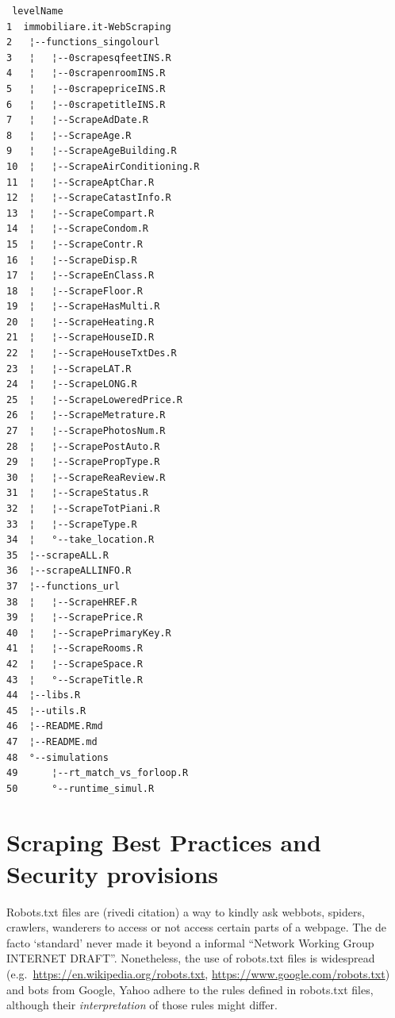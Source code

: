 \documentclass[
  12pt,
  a4paper,
  oneside]{book}
\theoremstyle{definition}
\theoremstyle{definition}
\theoremstyle{definition}
\theoremstyle{remark}
\begin{document}
\begin{verbatim}
 levelName
1  immobiliare.it-WebScraping     
2   ¦--functions_singolourl       
3   ¦   ¦--0scrapesqfeetINS.R     
4   ¦   ¦--0scrapenroomINS.R      
5   ¦   ¦--0scrapepriceINS.R      
6   ¦   ¦--0scrapetitleINS.R      
7   ¦   ¦--ScrapeAdDate.R         
8   ¦   ¦--ScrapeAge.R            
9   ¦   ¦--ScrapeAgeBuilding.R    
10  ¦   ¦--ScrapeAirConditioning.R
11  ¦   ¦--ScrapeAptChar.R        
12  ¦   ¦--ScrapeCatastInfo.R     
13  ¦   ¦--ScrapeCompart.R        
14  ¦   ¦--ScrapeCondom.R         
15  ¦   ¦--ScrapeContr.R          
16  ¦   ¦--ScrapeDisp.R           
17  ¦   ¦--ScrapeEnClass.R        
18  ¦   ¦--ScrapeFloor.R          
19  ¦   ¦--ScrapeHasMulti.R       
20  ¦   ¦--ScrapeHeating.R        
21  ¦   ¦--ScrapeHouseID.R        
22  ¦   ¦--ScrapeHouseTxtDes.R    
23  ¦   ¦--ScrapeLAT.R            
24  ¦   ¦--ScrapeLONG.R           
25  ¦   ¦--ScrapeLoweredPrice.R   
26  ¦   ¦--ScrapeMetrature.R      
27  ¦   ¦--ScrapePhotosNum.R      
28  ¦   ¦--ScrapePostAuto.R       
29  ¦   ¦--ScrapePropType.R       
30  ¦   ¦--ScrapeReaReview.R      
31  ¦   ¦--ScrapeStatus.R         
32  ¦   ¦--ScrapeTotPiani.R       
33  ¦   ¦--ScrapeType.R           
34  ¦   °--take_location.R        
35  ¦--scrapeALL.R                
36  ¦--scrapeALLINFO.R            
37  ¦--functions_url              
38  ¦   ¦--ScrapeHREF.R           
39  ¦   ¦--ScrapePrice.R          
40  ¦   ¦--ScrapePrimaryKey.R     
41  ¦   ¦--ScrapeRooms.R          
42  ¦   ¦--ScrapeSpace.R          
43  ¦   °--ScrapeTitle.R          
44  ¦--libs.R                     
45  ¦--utils.R                    
46  ¦--README.Rmd                 
47  ¦--README.md                  
48  °--simulations                
49      ¦--rt_match_vs_forloop.R  
50      °--runtime_simul.R
\end{verbatim}

\hypertarget{best-practices}{%
\section{Scraping Best Practices and Security provisions}\label{best-practices}}

Robots.txt files are (rivedi citation) a way to kindly ask webbots, spiders, crawlers, wanderers to access or not access certain parts of a webpage. The de facto `standard' never made it beyond a informal ``Network Working Group INTERNET DRAFT''. Nonetheless, the use of robots.txt files is widespread (e.g.~\url{https://en.wikipedia.org/robots.txt}, \url{https://www.google.com/robots.txt}) and bots from Google, Yahoo adhere to the rules defined in robots.txt files, although their \emph{interpretation} of those rules might differ.
\end{document}
